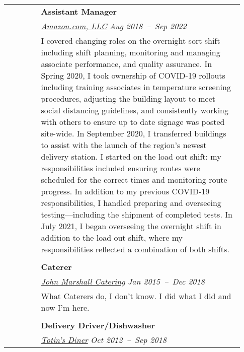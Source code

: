 \documentclass[letterpaper, 10pt, oneside]{article}
\newcommand{\bdit}[1]{{\textbf{#1}}}
\begin{document}
\begin{longtable}{@{} p{0.13\linewidth} p{0.8\linewidth}}
  & \bdit{Assistant Manager}
  \hfill  \\
  & \textsl{\href{https://www.aboutamazon.com/}{Amazon.com, LLC}}
  \hfill \textsl{Aug 2018\ --\ Sep 2022} \\
  
  & \parbox{0.8\textwidth}{I covered changing roles on the overnight sort
    shift including shift planning, monitoring and managing associate
    performance, and quality assurance. In Spring 2020, I took ownership of
    COVID-19 rollouts including training associates in temperature screening
    procedures, adjusting the building layout to meet social distancing
    guidelines, and consistently working with others to ensure up to date
    signage was posted site-wide. In September 2020, I transferred buildings
    to assist with the launch of the region’s newest delivery station. I
    started on the load out shift: my responsibilities included ensuring
    routes were scheduled for the correct times and monitoring route
    progress. In addition to my previous COVID-19 responsibilities, I handled
    preparing and overseeing testing—including the shipment of completed
    tests. In July 2021, I began overseeing the overnight shift in addition
    to the load out shift, where my responsibilities reflected a combination
    of both shifts.}
  \\
  \\
  & \bdit{Caterer}
  \hfill  \\
  & \textsl{\href{https://www.johnmarshallcatering.com/}{John Marshall Catering}}
  \hfill \textsl{Jan 2015\ --\ Dec 2018} \\
  
  & \parbox{0.8\textwidth}{What Caterers do, I don't know. I did what I did
    and now I'm here.}
  \\
  \\
  & \bdit{Delivery Driver/Dishwasher}
  \hfill  \\
  & \textsl{\href{https://www.totinsdiner.org/}{Totin's Diner}}
  \hfill \textsl{Oct 2012\ --\ Sep 2018} \\
  

\end{longtable}
\end{document}
